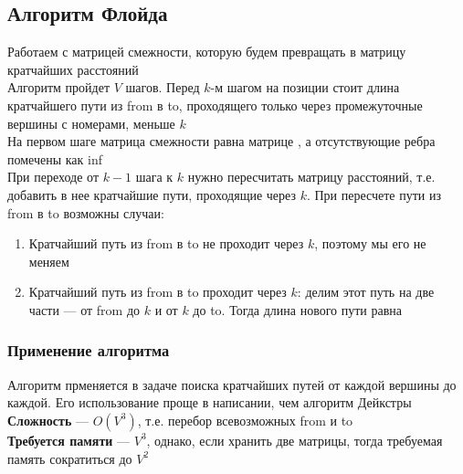 \documentclass[a4paper]{article}
\begin{document}
\subsection{Алгоритм Флойда}
Работаем с матрицей смежности, которую будем превращать в матрицу кратчайших расстояний\\[2mm]
\indent Алгоритм пройдет $V$ шагов. Перед $k$-м шагом на позиции  стоит длина кратчайшего пути из from в to, проходящего только через промежуточные вершины с номерами, меньше $k$\\[2mm]
\indent На первом шаге матрица смежности равна матрице , а отсутствующие ребра помечены как inf\\[2mm]
\indent При переходе от $k-1$ шага к $k$ нужно пересчитать матрицу расстояний, т.е. добавить в нее кратчайшие пути, проходящие через $k$. При пересчете пути из from в to возможны случаи:
\begin{enumerate}
    \item Кратчайший путь из from в to не проходит через $k$, поэтому мы его не меняем
    \item Кратчайший путь из from в to проходит через $k$: делим этот путь на две части — от from до $k$ и от $k$ до to. Тогда длина нового пути равна 
\end{enumerate}
\subsubsection*{Применение алгоритма}
Алгоритм прменяется в задаче поиска кратчайших путей от каждой вершины до каждой. Его использование проще в написании, чем алгоритм Дейкстры\\[2mm]
\indent\textbf{Сложность} — $O(V^3)$, т.е. перебор всевозможных from и to\\[2mm]
\indent\textbf{Требуется памяти} — $V^3$, однако, если хранить две матрицы, тогда требуемая память сократиться до $V^2$
\end{document}
